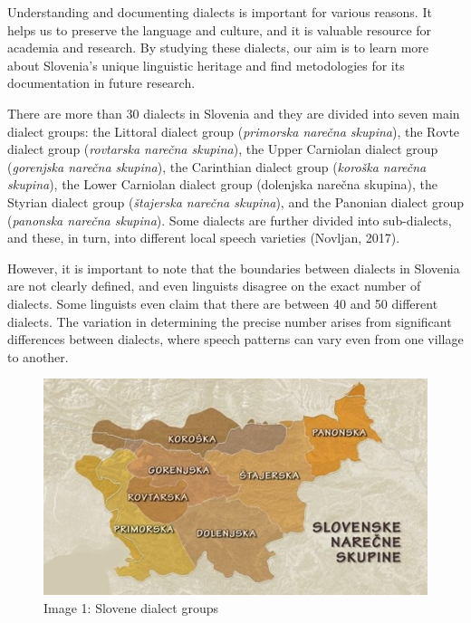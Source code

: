 \documentclass[fleqn,moreauthors,10pt]{ds_report}
\begin{document}
    Understanding and documenting dialects is important for various reasons. It helps us to preserve the language and culture, and it is valuable resource for academia and research. By studying these dialects, our aim is to learn more about Slovenia's unique linguistic heritage and find metodologies for its  documentation in future research. 

    There are more than 30 dialects in Slovenia and they are divided into seven main dialect groups: the Littoral dialect group (\textit{primorska narečna skupina}), the Rovte dialect group (\textit{rovtarska narečna skupina}), the Upper Carniolan dialect group (\textit{gorenjska narečna skupina}), the Carinthian dialect group (\textit{koroška narečna skupina}), the Lower Carniolan dialect group (dolenjska narečna skupina), the Styrian dialect group (\textit{štajerska narečna skupina}), and the Panonian dialect group (\textit{panonska narečna skupina}). Some dialects are further divided into sub-dialects, and these, in turn, into different local speech varieties 
(Novljan, 2017). 

    However, it is important to note that the boundaries between dialects in Slovenia are not clearly defined, and even linguists disagree on the exact number of dialects. Some linguists even claim that there are between 40 and 50 different dialects. The variation in determining the precise number arises from significant differences between dialects, where speech patterns can vary even from one village to another. 

    \begin{figure}
        \centering
        \includegraphics[width=1\linewidth]{narecne_skupine.jpg}
        \caption{Image 1: Slovene dialect groups
}
        \label{fig:map}
    \end{figure}
\end{document}
